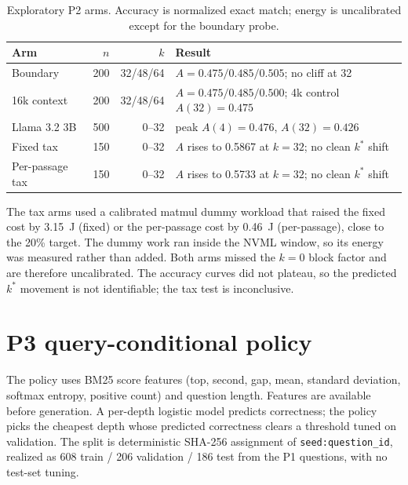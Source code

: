 \documentclass[a4paper,fleqn]{cas-sc}
\begin{document}
\begin{table}[pos=htbp]
  \centering
  \caption{Exploratory P2 arms. Accuracy is normalized exact match; energy is
  uncalibrated except for the boundary probe.}
  \label{tab:s8explore}
  \footnotesize
  \setlength{\tabcolsep}{5pt}
  \begin{tabularx}{\textwidth}{>{\raggedright\arraybackslash}p{3.4cm}rr>{\raggedright\arraybackslash}X}
    \toprule
    \textbf{Arm} & $n$ & $k$ & \textbf{Result} \\
    \midrule
    Boundary & 200 & 32/48/64 & $A=0.475/0.485/0.505$; no cliff at 32 \\
    16k context & 200 & 32/48/64 & $A=0.475/0.485/0.500$; 4k control $A(32)=0.475$ \\
    Llama 3.2 3B & 500 & 0--32 & peak $A(4)=0.476$, $A(32)=0.426$ \\
    Fixed tax & 150 & 0--32 & $A$ rises to 0.5867 at $k=32$; no clean $k^{*}$ shift \\
    Per-passage tax & 150 & 0--32 & $A$ rises to 0.5733 at $k=32$; no clean $k^{*}$ shift \\
    \bottomrule
  \end{tabularx}
\end{table}

The tax arms used a calibrated matmul dummy workload that raised the fixed
cost by 3.15~J (fixed) or the per-passage cost by 0.46~J (per-passage), close to
the 20\% target. The dummy work ran inside the NVML window, so its energy was
measured rather than added. Both arms missed the $k=0$ block factor and are
therefore uncalibrated. The accuracy curves did not plateau, so the predicted
$k^{*}$ movement is not identifiable; the tax test is inconclusive.

\section{P3 query-conditional policy}\label{sec:s9}

The policy uses BM25 score features (top, second, gap, mean, standard deviation,
softmax entropy, positive count) and question length. Features are available
before generation. A per-depth logistic model predicts correctness; the policy
picks the cheapest depth whose predicted correctness clears a threshold tuned on
validation. The split is deterministic SHA-256 assignment of
\texttt{seed:question\_id}, realized as 608 train / 206 validation / 186 test
from the P1 questions, with no test-set tuning.
\end{document}
